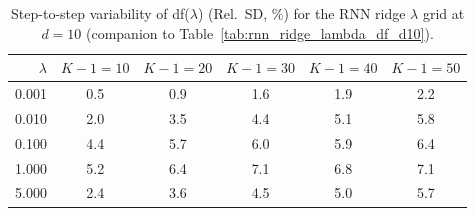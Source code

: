 \begin{table}

\caption{\label{tab:rnn_df_variability_d10}Step-to-step variability of df($\lambda$) (Rel.\ SD, \%) for the RNN ridge $\lambda$ grid at $d=10$ (companion to Table~\ref{tab:rnn_ridge_lambda_df_d10}).}
\footnotesize
\setlength{\tabcolsep}{4pt}
\centering
\begin{tabular}[t]{rccccc}
\toprule
$\lambda$ & $K-1=10$ & $K-1=20$ & $K-1=30$ & $K-1=40$ & $K-1=50$\\
\midrule
0.001 & 0.5 & 0.9 & 1.6 & 1.9 & 2.2\\
0.010 & 2.0 & 3.5 & 4.4 & 5.1 & 5.8\\
0.100 & 4.4 & 5.7 & 6.0 & 5.9 & 6.4\\
1.000 & 5.2 & 6.4 & 7.1 & 6.8 & 7.1\\
5.000 & 2.4 & 3.6 & 4.5 & 5.0 & 5.7\\
\bottomrule
\end{tabular}
\end{table}
